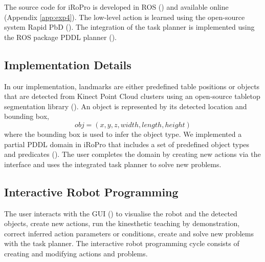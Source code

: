 The source code for iRoPro is developed in ROS (\cite{quigley2009ros}) and available online (Appendix \ref{app:exp4}). %
The low-level action is learned using the open-source system Rapid PbD (\cite{rapidpbd}).
The integration of the task planner is implemented using the ROS package PDDL planner (\cite{pddlplanner}).

\subsection{Implementation Details}
\label{sec:implementation}
In our implementation, landmarks are either predefined table positions or 
objects that are detected from Kinect Point Cloud clusters using an open-source tabletop segmentation library (\cite{surfaceperception}).
An object is represented by its detected location and bounding box, \ie 
$$obj = (x,y,z, width, length, height)$$ 
where the bounding box is used to infer the object type.
We implemented a partial PDDL domain in iRoPro that includes a set of predefined object types and predicates ().
The user completes the domain by creating new actions via the interface and uses the integrated task planner to solve new problems.


\subsection{Interactive Robot Programming}
\label{sec:interactive}
The user interacts with the GUI () to visualise the robot and the detected objects, create new actions, run the kinesthetic teaching by demonstration, correct inferred action parameters or conditions, create and solve new problems with the task planner.
The interactive robot programming cycle consists of creating and modifying actions and problems.

